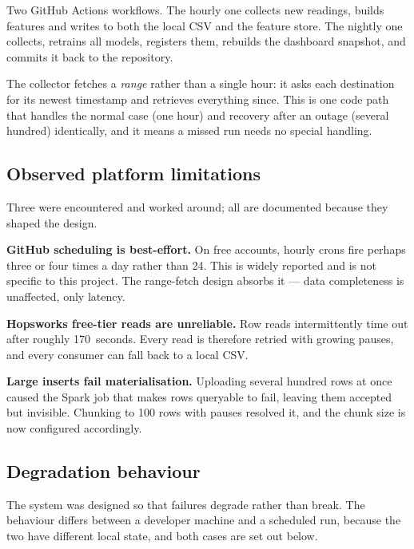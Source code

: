 \documentclass[11pt,a4paper]{article}
\begin{document}
Two GitHub Actions workflows. The hourly one collects new readings,
builds features and writes to both the local CSV and the feature store.
The nightly one collects, retrains all models, registers them, rebuilds
the dashboard snapshot, and commits it back to the repository.

The collector fetches a \emph{range} rather than a single hour: it asks
each destination for its newest timestamp and retrieves everything
since. This is one code path that handles the normal case (one hour) and
recovery after an outage (several hundred) identically, and it means a
missed run needs no special handling.

\subsection{Observed platform limitations}

Three were encountered and worked around; all are documented because
they shaped the design.

\textbf{GitHub scheduling is best-effort.} On free accounts, hourly
crons fire perhaps three or four times a day rather than 24. This is
widely reported and is not specific to this project. The range-fetch
design absorbs it --- data completeness is unaffected, only latency.

\textbf{Hopsworks free-tier reads are unreliable.} Row reads
intermittently time out after roughly 170~seconds. Every read is
therefore retried with growing pauses, and every consumer can fall back
to a local CSV.

\textbf{Large inserts fail materialisation.} Uploading several hundred
rows at once caused the Spark job that makes rows queryable to fail,
leaving them accepted but invisible. Chunking to 100 rows with pauses
resolved it, and the chunk size is now configured accordingly.

\subsection{Degradation behaviour}

The system was designed so that failures degrade rather than break. The
behaviour differs between a developer machine and a scheduled run,
because the two have different local state, and both cases are set out
below.
\end{document}
